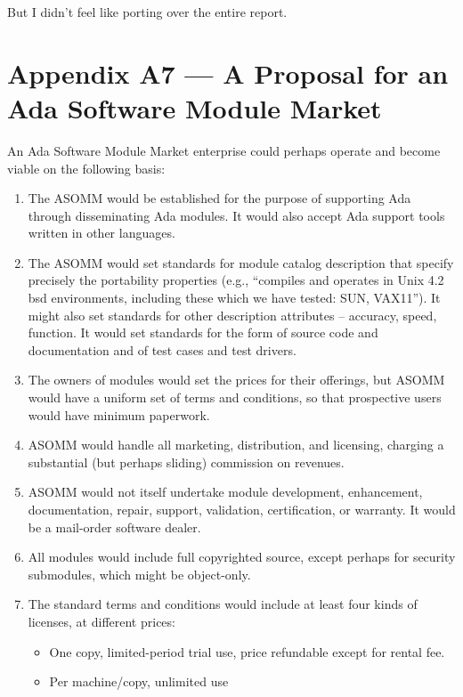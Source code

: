 \documentclass[12pt]{article}
\begin{document}
But I didn’t feel like porting over the entire report.

\newpage
\section*{Appendix A7 — A Proposal for an Ada Software Module Market}

An Ada Software Module Market enterprise could perhaps operate and become
viable on the following basis:

\begin{enumerate}
    \item The ASOMM would be established for the purpose of supporting Ada
        through disseminating Ada modules. It would also accept Ada support
        tools written in other languages.
    \item The ASOMM would set standards for module catalog description that
        specify precisely the portability properties (e.g., “compiles and
        operates in Unix 4.2 bsd environments, including these which we have
        tested: SUN, VAX11”). It might also set standards for other description
        attributes – accuracy, speed, function. It would set standards for the
        form of source code and documentation and of test cases and test
        drivers.
    \item The owners of modules would set the prices for their offerings, but
        ASOMM would have a uniform set of terms and conditions, so that
        prospective users would have minimum paperwork.
    \item ASOMM would handle all marketing, distribution, and licensing,
        charging a substantial (but perhaps sliding) commission on revenues.
    \item ASOMM would not itself undertake module development, enhancement,
        documentation, repair, support, validation, certification, or warranty.
        It would be a mail-order software dealer.
    \item All modules would include full copyrighted source, except perhaps for
        security submodules, which might be object-only.
    \item The standard terms and conditions would include at least four kinds
        of licenses, at different prices:
\begin{itemize}
        \item One copy, limited-period trial use, price refundable except for
            rental fee.
        \item Per machine/copy, unlimited use

\end{itemize}
\end{enumerate}
\end{document}
